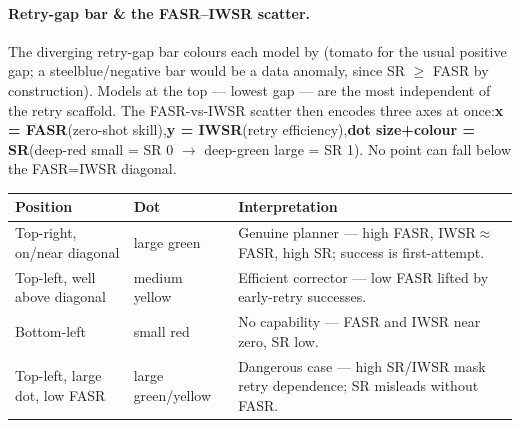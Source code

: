 \paragraph{Retry-gap bar \& the FASR--IWSR scatter.}

The diverging retry-gap bar colours each model by \allowbreak{}(tomato for the usual positive gap; a steelblue/negative bar would be a data anomaly, since SR \(\ge\) FASR by construction). Models at the top --- lowest gap --- are the most independent of the retry scaffold. The FASR-vs-IWSR scatter then encodes three axes at once:\textbf{x = FASR}(zero-shot skill),\textbf{y = IWSR}(retry efficiency),\textbf{dot size+colour = SR}(deep-red small = SR 0 \(\rightarrow\) deep-green large = SR 1). No point can fall below the FASR=IWSR diagonal.

\begin{table}[h]\small
\centering
\begin{tabularx}{\linewidth}{@{}l l Y@{}}
\toprule
Position & Dot & Interpretation\\
\midrule
Top-right, on/near diagonal & large green & Genuine planner --- high FASR, IWSR\(\approx\)FASR, high SR; success is first-attempt.\\
\addlinespace
Top-left, well above diagonal & medium yellow & Efficient corrector --- low FASR lifted by early-retry successes.\\
\addlinespace
Bottom-left & small red & No capability --- FASR and IWSR near zero, SR low.\\
\addlinespace
Top-left, large dot, low FASR & large green/yellow & Dangerous case --- high SR/IWSR mask retry dependence; SR misleads without FASR.\\
\bottomrule
\end{tabularx}
\end{table}
